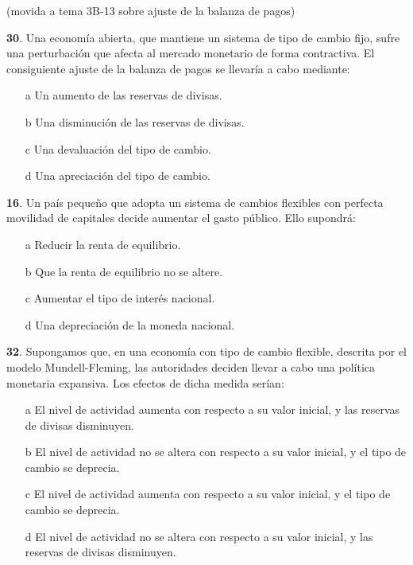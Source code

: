 \documentclass{nuevotema}
\begin{document}
(movida a tema 3B-13 sobre ajuste de la balanza de pagos)

\textbf{30}. Una economía abierta, que mantiene un sistema de tipo de cambio fijo, sufre una perturbación que afecta al mercado monetario de forma contractiva. El consiguiente ajuste de la balanza de pagos se llevaría a cabo mediante:
\begin{enumerate}
	\item[a] Un aumento de las reservas de divisas.
	\item[b] Una disminución de las reservas de divisas.
	\item[c] Una devaluación del tipo de cambio.
	\item[d] Una apreciación del tipo de cambio.
\end{enumerate}


\textbf{16}. Un país pequeño que adopta un sistema de cambios flexibles con perfecta movilidad de capitales decide aumentar el gasto público. Ello supondrá:

\begin{enumerate}
	\item[a] Reducir la renta de equilibrio.
	\item[b] Que la renta de equilibrio no se altere.
	\item[c] Aumentar el tipo de interés nacional.
	\item[d] Una depreciación de la moneda nacional.
\end{enumerate}


\textbf{32}. Supongamos que, en una economía con tipo de cambio flexible, descrita por el modelo Mundell-Fleming, las autoridades deciden llevar a cabo una política monetaria expansiva. Los efectos de dicha medida serían:
\begin{enumerate}
	\item[a] El nivel de actividad aumenta con respecto a su valor inicial, y las reservas de divisas disminuyen.
	\item[b] El nivel de actividad no se altera con respecto a su valor inicial, y el tipo de cambio se deprecia. 
	\item[c] El nivel de actividad aumenta con respecto a su valor inicial, y el tipo de cambio se deprecia.
	\item[d] El nivel de actividad no se altera con respecto a su valor inicial, y las reservas de divisas disminuyen.
\end{enumerate}
\end{document}
